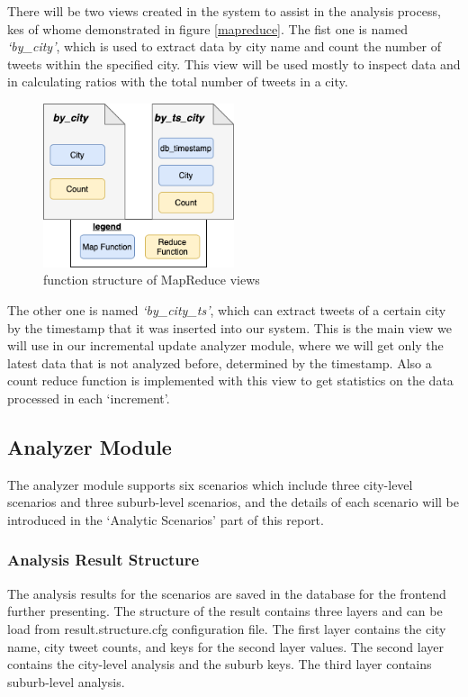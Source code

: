 \documentclass{article}
\begin{document}
There will be two views created in the system to assist in the analysis process, kes of whome demonstrated in figure \ref{mapreduce}. The fist one is named \textit{‘by\_city’}, which is used to extract data by city name and count the number of tweets within the specified city. This view will be used mostly to inspect data and in calculating ratios with the total number of tweets in a city.
\begin{figure}
\centering
\includegraphics[width=0.5\textwidth]{img/mapreduce.png}
\caption{function structure of MapReduce views}
\label{fig:mapreduce}
\end{figure}

The other one is named \textit{‘by\_city\_ts’}, which can extract tweets of a certain city by the timestamp that it was inserted into our system. This is the main view we will use in our incremental update analyzer module, where we will get only the latest data that is not analyzed before, determined by the timestamp. Also a count reduce function is implemented with this view to get statistics on the data processed in each ‘increment’.

\subsection{Analyzer Module}
The analyzer module supports six scenarios which include three city-level scenarios and three suburb-level scenarios, and the details of each scenario will be introduced in the ‘Analytic Scenarios’ part of this report.
\subsubsection{Analysis Result Structure}
The analysis results for the scenarios are saved in the database for the frontend further presenting. The structure of the result contains three layers and can be load from result.structure.cfg configuration file. The first layer contains the city name, city tweet counts, and keys for the second layer values. The second layer contains the city-level analysis and the suburb keys. The third layer contains suburb-level analysis.
\end{document}
